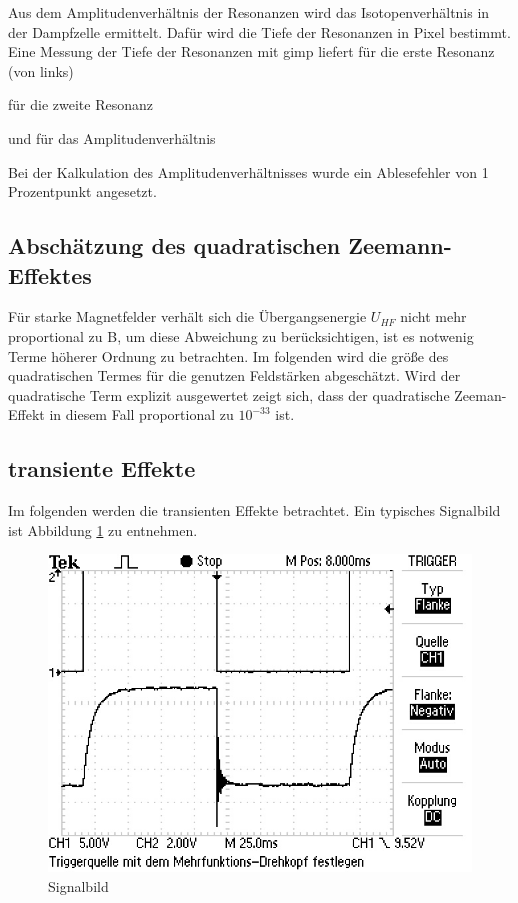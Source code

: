 Aus dem Amplitudenverhältnis der Resonanzen wird das Isotopenverhältnis in der
Dampfzelle ermittelt. Dafür wird die Tiefe der Resonanzen in Pixel bestimmt.
Eine Messung der Tiefe der Resonanzen mit gimp liefert für die erste Resonanz (von links)



für die zweite Resonanz



und für das Amplitudenverhältnis



Bei der Kalkulation des Amplitudenverhältnisses wurde ein Ablesefehler von 1 Prozentpunkt
angesetzt.

\subsection{Abschätzung des quadratischen Zeemann-Effektes}
Für starke Magnetfelder verhält sich die Übergangsenergie $U_{HF}$ nicht mehr proportional zu B, um diese Abweichung zu berücksichtigen, ist es notwenig Terme höherer Ordnung zu betrachten.
Im folgenden wird die größe des quadratischen Termes für die genutzen Feldstärken abgeschätzt. Wird der quadratische Term explizit ausgewertet zeigt sich, dass der quadratische Zeeman-Effekt
in diesem Fall proportional zu $10^{-33}$ ist.

\subsection{transiente Effekte}
Im folgenden werden die transienten Effekte betrachtet. Ein typisches Signalbild ist Abbildung \ref{sigPic} zu entnehmen.

\begin{figure}[H]
\centering
\includegraphics[scale=0.8]{./optischesPumpen/img/TEK0019.JPG}
\caption{Signalbild}
\label{sigPic}
\end{figure}

